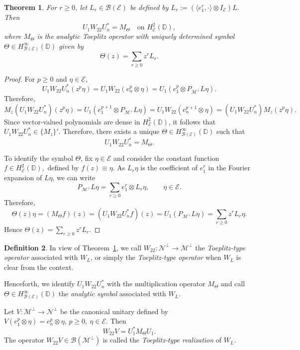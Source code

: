 \documentclass[12pt]{amsart}
\newtheorem{theorem}{Theorem}[section]
\theoremstyle{definition}
\newtheorem{definition}[theorem]{Definition}
\theoremstyle{remark}
\def \D{\mathbb{D}}
\newcommand{\clb}{\mathcal{B}}
\newcommand{\cle}{\mathcal{E}}
\newcommand{\clm}{\mathcal{M}}
\newcommand{\cln}{\mathcal{N}}
\numberwithin{equation}{section}
\begin{document}
\begin{theorem}\label{prop:hardy_space_multiplier}
For \(r\geq 0\), let
\(L_r\in\clb(\cle)\) be defined by $L_r:=(\langle e_1^r,\cdot\rangle\otimes I_\cle)L.$
Then
\[
U_1W_{22}U_n^*=M_\Theta
\quad \text{on } H^2_{\cle}(\D),
\]
where \(M_\Theta\) is the analytic Toeplitz operator with uniquely determined
symbol \(\Theta\in H^\infty_{\clb(\cle)}(\D)\) given by
\[
\Theta(z)=\sum_{r\geq 0}z^rL_r.
\]
\end{theorem}
\begin{proof}
For $p\ge 0$ and $\eta\in\cle$, 
\[
U_1W_{22}U_n^*(z^p\eta)
=
U_1W_{22}(e_n^p\otimes \eta)
=
U_1(e_1^p\otimes P_{\clm^\perp}L\eta).
\]
Therefore,
\[
M_z(U_1W_{22}U_n^*)(z^p\eta)
=
U_1(e_1^{p+1}\otimes P_{\clm^\perp}L\eta)
=
U_1W_{22}(e_n^{p+1}\otimes \eta)
=
(U_1W_{22}U_n^*)M_z(z^p\eta).
\]
Since vector-valued polynomials are dense in $H^2_{\cle}(\D)$, it follows that $U_1W_{22}U_n^*\in \{M_z\}'.$
Therefore, there exists a unique $\Theta\in H^\infty_{\clb(\cle)}(\D)$
such that $$U_1W_{22}U_n^*=M_\Theta.$$

To identify the symbol $\Theta$, fix $\eta\in\cle$ and consider the constant function $f\in H^2_{\cle}(\D),$ defined by $f(z)\equiv \eta.$
As $L_r\eta$ is the coefficient of $e_1^r$ in the Fourier expansion of $L\eta$, we can write
\begin{equation} \label{eq:Ltilde in terms of Lr}
 P_{\clm^{\perp}} L\eta
=
\sum_{r\ge 0} e_1^r\otimes L_r\eta,
\qquad \eta\in\cle.  
\end{equation}   
Therefore,
\[
\Theta(z)\eta
=
(M_\Theta f)(z)
=
(U_1W_{22}U_n^*f)(z)
=
U_1(P_{\clm^{\perp}}L\eta)
=
\sum_{r\ge 0} z^rL_r\eta.
\]
Hence $\Theta(z)=\sum_{r\ge 0} z^rL_r.$
\end{proof}



\begin{definition}\label{rem:toeplitz_block}
In view of Theorem~\ref{prop:hardy_space_multiplier}, we call $W_{22}:\cln^\perp\to \clm^\perp$
the \emph{Toeplitz-type operator} associated with \(W_L\), or simply the
\emph{Toeplitz-type operator} when \(W_L\) is clear from the context.

Henceforth, we
identify $U_1W_{22}U_n^*$ with the multiplication operator \(M_\Theta\) and call
\(\Theta\in H^\infty_{\clb(\cle)}(\D)\) the \emph{analytic symbol} associated
with \(W_L\).

Let \(V:\clm^\perp\to \cln^\perp\) be the canonical unitary defined by $V(e_1^p\otimes \eta)=e_n^p\otimes \eta,
\, p\geq 0,\ \eta\in\cle.$ Then
\[
W_{22}V=U_1^*M_\Theta U_1.
\]
The operator \(W_{22}V\in \clb(\clm^\perp)\) is called the \emph{Toeplitz-type realization} of \(W_L\).
\end{definition}
\end{document}
